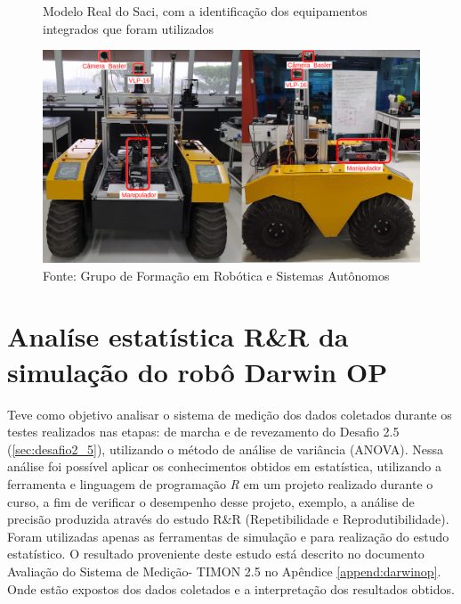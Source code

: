 \begin{figure}[H]
    \caption{Modelo Real do Saci, com a identificação dos equipamentos integrados que foram utilizados}
    \centering
    \includegraphics[width= \textwidth]{Figures/warthog_compo2.png}
    \caption*{Fonte: Grupo de Formação em Robótica e Sistemas Autônomos}
    \label{fig:warthog_desafio_3}
\end{figure}


\section{Analíse estatística R\&R da simulação do robô Darwin OP }
\label{sec:analise_darwin}
Teve como objetivo analisar o sistema de medição dos dados coletados durante os testes realizados nas etapas: de marcha e de revezamento do Desafio 2.5 (\ref{sec:desafio2_5}), utilizando o método de análise de variância (ANOVA). Nessa análise foi possível aplicar os conhecimentos obtidos em estatística, utilizando a ferramenta e linguagem de programação \textit{R} em um projeto realizado durante o curso, a fim de verificar o desempenho desse projeto, exemplo, a análise de precisão produzida através do estudo R\&R (Repetibilidade e Reprodutibilidade). Foram utilizadas apenas as ferramentas de simulação e para realização do estudo estatístico.
O resultado proveniente deste estudo está descrito no documento Avaliação do Sistema de Medição- TIMON 2.5 no Apêndice \ref{append:darwinop}. Onde estão expostos dos dados coletados e a interpretação dos resultados obtidos.


